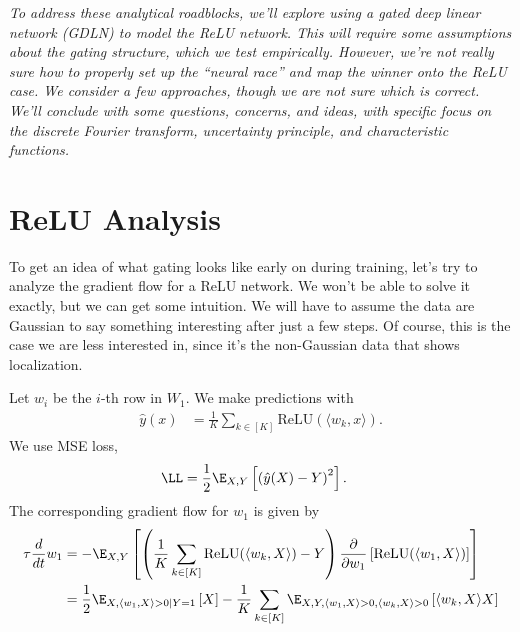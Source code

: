 \documentclass{article}
\begin{document}
\emph{To address these analytical roadblocks, we'll explore using a gated deep linear network (GDLN) to model the ReLU network.
This will require some assumptions about the gating structure, which we test empirically.
However, we're not really sure how to properly set up the ``neural race'' and map the winner onto the ReLU case.
We consider a few approaches, though we are not sure which is correct.
We'll conclude with some questions, concerns, and ideas, with specific focus on the discrete Fourier transform, uncertainty principle, and characteristic functions.}


\section{ReLU Analysis}
To get an idea of what gating looks like early on during training, let's try to analyze the gradient flow for a ReLU network.
We won't be able to solve it exactly, but we can get some intuition.
We will have to assume the data are Gaussian to say something interesting after just a few steps.
Of course, this is the case we are less interested in, since it's the non-Gaussian data that shows localization.

Let $w_i$ be the $i$-th row in $W_1$.
We make predictions with
\begin{align}
  \hat{y}(x) &= \frac{1}{K} \sum_{k \in [K]} \text{ReLU}(\langle w_k, x \rangle).
\end{align}
We use MSE loss,
\begin{align}
  \LL &= \frac{1}{2} \E_{X,Y} \left[ \left( \hat{y}(X) - Y \right)^2 \right].
\end{align}
The corresponding gradient flow for $w_1$ is given by
\begin{align}
  \tau \frac{d}{dt} w_1
  &= -\E_{X,Y} \left[ \left( \frac{1}{K} \sum_{k \in [K]} \text{ReLU}(\langle w_k, X \rangle) - Y \right) \frac{\partial}{\partial w_1} \left[ \text{ReLU}(\langle w_1, X \rangle) \right] \right] \\
  &= \frac{1}{2} \E_{X, \langle w_1, X \rangle > 0 \mid Y=1} \left[ X \right] - \frac{1}{K} \sum_{k \in [K]} \E_{X,Y, \langle w_1, X \rangle > 0, \langle w_k, X \rangle > 0} \left[ \langle w_k, X \rangle X \right]
\end{align}

\end{document}

